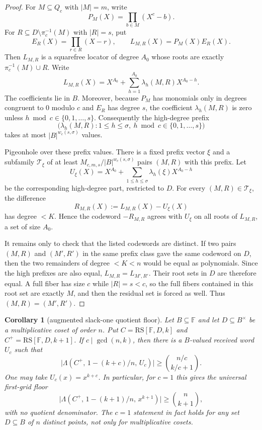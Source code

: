 \documentclass[11pt]{article}
\newtheorem{corollary}[theorem]{Corollary}
\theoremstyle{definition}
\theoremstyle{remark}
\newcommand{\F}{\mathbb{F}}
\newcommand{\B}{B}
\newcommand{\RS}{\mathrm{RS}}
\newcommand{\Lst}{\Lambda}
\begin{document}
\begin{proof}
For $M\subseteq Q_c$ with $|M|=m$, write
\[
        P_M(X)=\prod_{b\in M}(X^c-b).
\]
For $R\subseteq D\setminus \pi_c^{-1}(M)$ with $|R|=s$, put
\[
        E_R(X)=\prod_{r\in R}(X-r),
        \qquad
        L_{M,R}(X)=P_M(X)E_R(X).
\]
Then $L_{M,R}$ is a squarefree locator of degree $A_0$ whose roots are exactly
\(\pi_c^{-1}(M)\cup R\).  Write
\[
        L_{M,R}(X)=X^{A_0}+\sum_{h=1}^{A_0}\lambda_h(M,R)X^{A_0-h}.
\]
The coefficients lie in $\B$.  Moreover, because $P_M$ has monomials only in
degrees congruent to $0$ modulo $c$ and $E_R$ has degree $s$, the coefficient
$\lambda_h(M,R)$ is zero unless $h\bmod c\in\{0,1,\ldots,s\}$.
Consequently the high-degree prefix
\[
        \bigl(\lambda_h(M,R):1\le h\le\sigma,
              \ h\bmod c\in\{0,1,\ldots,s\}\bigr)
\]
takes at most $|\B|^{w_c(s,\sigma)}$ values.

Pigeonhole over these prefix values.  There is a fixed prefix vector $\xi$ and a
subfamily $\mathcal T_\xi$ of at least
$M_{c,m,s}/|\B|^{w_c(s,\sigma)}$ pairs $(M,R)$ with this prefix.  Let
\[
        U_\xi(X)=X^{A_0}+\sum_{1\le h\le\sigma}\lambda_h(\xi)X^{A_0-h}
\]
be the corresponding high-degree part, restricted to $D$.  For every
$(M,R)\in\mathcal T_\xi$, the difference
\[
        R_{M,R}(X):=L_{M,R}(X)-U_\xi(X)
\]
has degree $<K$.  Hence the codeword $-R_{M,R}$ agrees with $U_\xi$ on all
roots of $L_{M,R}$, a set of size $A_0$.

It remains only to check that the listed codewords are distinct.  If two pairs
$(M,R)$ and $(M',R')$ in the same prefix class gave the same codeword on $D$,
then the two remainders of degree $<K<n$ would be equal as polynomials.  Since
the high prefixes are also equal, $L_{M,R}=L_{M',R'}$.  Their root sets in $D$
are therefore equal.  A full fiber has size $c$ while $|R|=s<c$, so the full
fibers contained in this root set are exactly $M$, and then the residual set is
forced as well.  Thus $(M,R)=(M',R')$.
\end{proof}

\begin{corollary}[augmented slack-one quotient floor]
\label{cor:augmented-slack-one}
Let $\B\subseteq\F$ and let $D\subseteq\B^\times$ be a multiplicative coset
of order $n$.  Put $C=\RS[\F,D,k]$ and $C^+=\RS[\F,D,k+1]$.  If
$c\mid\gcd(n,k)$, then there is a $\B$-valued received word $U_c$ such that
\[
        \bigl|\Lst(C^+,\,1-(k+c)/n,\,U_c)\bigr|
        \ge
        \binom{n/c}{k/c+1} .
\]
One may take $U_c(x)=x^{k+c}$.  In particular, for $c=1$ this gives the
universal first-grid floor
\[
        \bigl|\Lst(C^+,\,1-(k+1)/n,\,x^{k+1})\bigr|
        \ge
        \binom n{k+1},
\]
with no quotient denominator.  The $c=1$ statement in fact holds for any set
$D\subseteq\B$ of $n$ distinct points, not only for multiplicative cosets.
\end{corollary}
\end{document}
